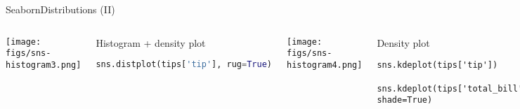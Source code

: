 \documentclass[10pt,compress]{beamer} %
\begin{document}
\begin{frame}[fragile]{Seaborn}{Distributions (II)}
	\begin{columns}[t]
	\texttt{[image: figs/sns-histogram3.png]}\\

	\begin{exampleblock}{\footnotesize{Histogram + density plot}}
	\vspace{-0.2cm} 
	\begin{lstlisting}[basicstyle=\small,language=Python]
	sns.distplot(tips['tip'], rug=True)
	\end{lstlisting}
	\vspace{-0.2cm} 
	\end{exampleblock}

	\texttt{[image: figs/sns-histogram4.png]}\\
	\begin{exampleblock}{\footnotesize{Density plot}}
	\vspace{-0.2cm} 
	\begin{lstlisting}[basicstyle=\small]
	sns.kdeplot(tips['tip'])
	sns.kdeplot(tips['total_bill'], shade=True)
	\end{lstlisting}
	\vspace{-0.2cm} 
	\end{exampleblock}
	\end{columns}
\end{frame}
\end{document}
